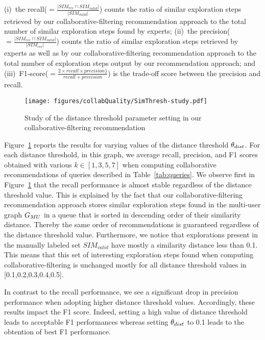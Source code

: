 (i)~the recall($=\frac{|SIM_{rec} \cap SIM_{valid}|}{|SIM_{valid}|}$) counts the ratio of similar exploration steps retrieved by our collaborative-filtering recommendation approach to the total number of similar exploration steps found by experts;
(ii)~the precision($=\frac{|SIM_{rec} \cap SIM_{valid}|}{|SIM_{rec}|}$) counts the ratio of similar exploration steps retrieved by experts as well as by our collaborative-filtering recommendation approach to the total number of exploration steps output by our recommendation approach; and
(iii)~F1-score($=\frac{2 \times recall \times precision\}}{recall + precision}$) is the trade-off score between the precision and recall. 




\begin{figure}[t]
\centering
\texttt{[image: figures/collabQuality/SimThresh-study.pdf]}
\caption{Study of the distance threshold parameter setting in our collaborative-filtering recommendation}
\label{fig:thresh-sim}
\end{figure}
Figure~\ref{fig:thresh-sim} reports the results for varying values of the distance threshold $\theta_{dist}$.
For each distance threshold, in this graph, we average recall, precision, and F1 scores obtained with various $k \in [1,3,5,7]$ when computing collaborative recommendations of queries described in Table~\ref{tab:queries}.
We observe first in Figure~\ref{fig:thresh-sim} that the recall performance is almost stable regardless of the distance threshold value. 
This is explained by the fact that our collaborative-filtering recommendation approach stores similar exploration steps found in the multi-user graph $G_{MU}$ in a queue that is sorted in descending order of their similarity distance. Thereby the same order of recommendations is guaranteed regardless of the distance threshold value.
Furthermore, we notice that explorations present in the manually labeled set $SIM_{valid}$ have mostly a similarity distance less than 0.1. This means that this set of interesting exploration steps found when computing collaborative-filtering is unchanged mostly for all distance threshold values in [0.1,0.2,0.3,0.4,0.5].


In contrast to the recall performance, we see a significant drop in precision performance when adopting higher distance threshold values. Accordingly, these results impact the F1 score. Indeed, setting a high value of distance threshold leads to acceptable F1 performances whereas setting $\theta_{dist}$ to 0.1 leads to the obtention of best F1 performance.







